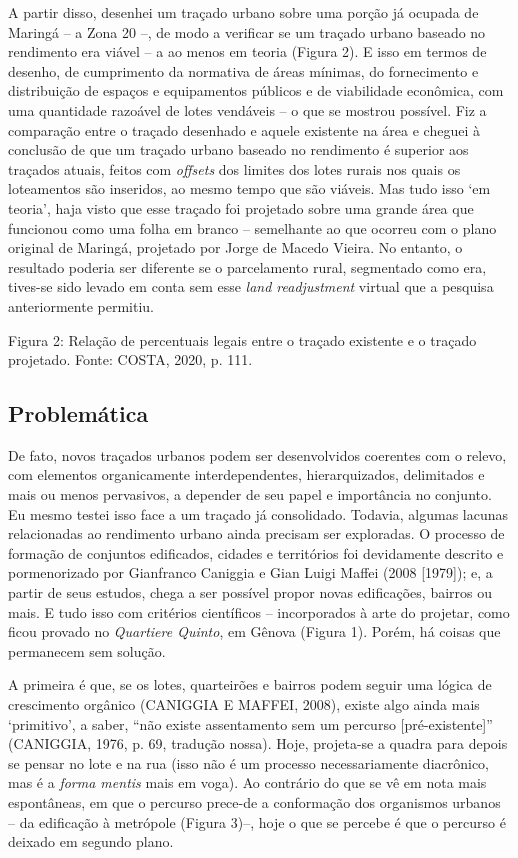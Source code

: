 \documentclass[twoside, 12pt, english,italian,latin,greek,french,spanish,brazil]{book}
\begin{document}
        A partir disso, desenhei um traçado urbano sobre uma porção já ocupada de Maringá – a Zona 20 –, de modo a verificar se um traçado urbano baseado no rendimento era viável – a ao menos em teoria (Figura 2). E isso em termos de desenho, de cumprimento da normativa de áreas mínimas, do fornecimento e distribuição de espaços e equipamentos públicos e de viabilidade econômica, com uma quantidade razoável de lotes vendáveis – o que se mostrou possível. Fiz a comparação entre o traçado desenhado e aquele existente na área e cheguei à conclusão de que um traçado urbano baseado no rendimento é superior aos traçados atuais, feitos com \textit{offsets} dos limites dos lotes rurais nos quais os loteamentos são inseridos, ao mesmo tempo que são viáveis. Mas tudo isso ‘em teoria’, haja visto que esse traçado foi projetado sobre uma grande área que funcionou como uma folha em branco – semelhante ao que ocorreu com o plano original de Maringá, projetado por Jorge de Macedo Vieira. No entanto, o resultado poderia ser diferente se o parcelamento rural, segmentado como era, tives-se sido levado em conta sem esse \textit{land readjustment} virtual que a pesquisa anteriormente permitiu.
 
        \caption{Figura 2: Relação de percentuais legais entre o traçado existente e o traçado projetado. Fonte: COSTA, 2020, p. 111.}

    \subsection{Problemática}

        De fato, novos traçados urbanos podem ser desenvolvidos coerentes com o relevo, com elementos organicamente interdependentes, hierarquizados, delimitados e mais ou menos pervasivos, a depender de seu papel e importância no conjunto. Eu mesmo testei isso face a um traçado já consolidado. Todavia, algumas lacunas relacionadas ao rendimento urbano ainda precisam ser exploradas. O processo de formação de conjuntos edificados, cidades e territórios foi devidamente descrito e pormenorizado por Gianfranco Caniggia e Gian Luigi Maffei (2008 [1979]); e, a partir de seus estudos, chega a ser possível propor novas edificações, bairros ou mais. E tudo isso com critérios científicos – incorporados à arte do projetar, como ficou provado no \textit{Quartiere Quinto}, em Gênova (Figura 1). Porém, há coisas que permanecem sem solução.

        A primeira é que, se os lotes, quarteirões e bairros podem seguir uma lógica de crescimento orgânico (CANIGGIA E MAFFEI, 2008), existe algo ainda mais ‘primitivo’, a saber, “não existe assentamento sem um percurso [pré-existente]” (CANIGGIA, 1976, p. 69, tradução nossa). Hoje, projeta-se a quadra para depois se pensar no lote e na rua (isso não é um processo necessariamente diacrônico, mas é a \textit{forma mentis} mais em voga). Ao contrário do que se vê em nota mais espontâneas, em que o percurso prece-de a conformação dos organismos urbanos – da edificação à metrópole (Figura 3)–,   hoje o que se percebe é que o percurso é deixado em segundo plano.
\end{document}
